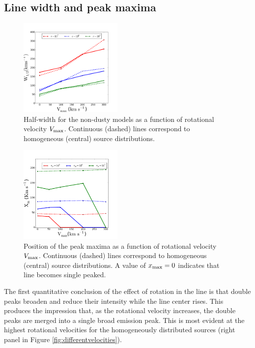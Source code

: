 \documentclass[usenatbib]{mn2e}
\newcommand{\ly}{{\ifmmode{{\rm Ly}\alpha~}\else{Ly$\alpha$~}\fi}}
\begin{document}
\subsection{Line width and peak maxima}
\label{sec:widthpeak}


\begin{figure}
    \includegraphics[width=0.45\textwidth]{WidthVvsVmax.png}
    \caption{Half-width for the non-dusty models as a function of
      rotational velocity $V_{\rm max}$. Continuous (dashed) lines
      correspond to homogeneous (central) source
      distributions. \label{fig:widthvsvelocity}} 
\end{figure}


\begin{figure}
    \includegraphics[width=0.45\textwidth]{maximumVvsVmax.png}
\caption{Position of the peak maxima as a function of rotational
  velocity $V_{\rm max}$. Continuous (dashed) lines correspond to
  homogeneous (central) source distributions. A value of $x_{\rm
    max}=0$ indicates that line becomes single
  peaked. \label{fig:maximumsvsvelocity}}  
\end{figure}

The first quantitative conclusion of the effect of rotation in the
\ly line is that double peaks broaden and reduce their intensity
while the line center rises. This produces the impression that, as the
rotational velocity increases, the double peaks are merged into a
single broad emission peak. This is most evident at the highest
rotational velocities for the homogeneously distributed sources
(right panel in Figure \ref{fig:differentvelocities}). 
\end{document}
